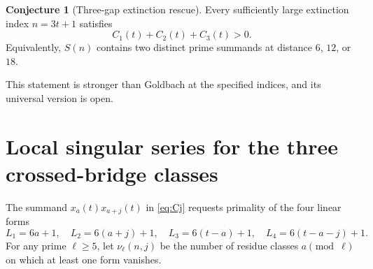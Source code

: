 \documentclass[11pt,a4paper]{article}
\theoremstyle{definition}
\newtheorem{conjecture}[theorem]{Conjecture}
\begin{document}
\begin{conjecture}[Three-gap extinction rescue]\label{conj:threegap}
Every sufficiently large extinction index $n=3t+1$ satisfies
\begin{equation}\label{eq:threegapconj}
 C_1(t)+C_2(t)+C_3(t)>0.
\end{equation}
Equivalently, $S(n)$ contains two distinct prime summands at distance $6$, $12$, or $18$.
\end{conjecture}
\noindent This statement is stronger than Goldbach at the specified indices, and its universal version is open.

\section{Local singular series for the three crossed-bridge classes}
The summand $x_a(t)x_{a+j}(t)$ in \eqref{eq:Cj} requests primality of the four linear forms
\begin{equation}\label{eq:fourforms}
 L_1=6a+1,\quad L_2=6(a+j)+1,\quad
 L_3=6(t-a)+1,\quad L_4=6(t-a-j)+1.
\end{equation}
For any prime $\ell\ge5$, let $\nu_\ell(n,j)$ be the number of residue classes $a\pmod\ell$ on which at least one form vanishes.
\end{document}
